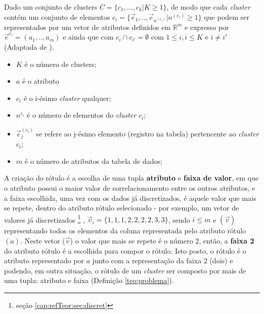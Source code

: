     \begin{teorema}
    Dado um conjunto de clusters ${C=\{c_1,...,c_k | K \geqslant 1\} }$, de modo que cada \textit{cluster} contém um conjunto de elementos ${c_i=\{\vec{e}_1,..,\vec{e}_{n^{(c_i)}}|n^{(c_i)} \geqslant 1 \}}$ que podem ser representados por um vetor de atributos definidos em ${\mathbb{R}^m }$ e expresso por ${ \vec{e}^{c_i}=(a_1,..,a_m)  }$ e ainda que  com ${ c_i \cap c_{i'}=\emptyset }$ com ${ 1 \leqslant i, i \leqslant K  }$ e ${ i \neq i' }$ (Adaptada de \cite{LOPES2014}).
        \begin{itemize}[noitemsep]
            \item ${K}$ é o número de clusters;
            \item ${a}$ é o atributo
            \item ${c_i}$ é o i-ésimo \textit{cluster} qualquer;
            \item ${n^{c_i}}$ é o número de elementos do \textit{cluster} ${c_i}$;
            \item ${\vec{e}^{(c_i)}_j}$ se refere ao j-ésimo  elemento (registro na tabela) pertencente ao \textit{cluster} ${c_i}$;
            \item ${m}$ é o número de atributos da tabela de dados;
        \end{itemize}
    \label{teo:problema}
    \end{teorema}

A criação do rótulo é a escolha de uma tupla \textbf{atributo} e \textbf{faixa de valor}, em que o atributo possui o maior valor de correlacionamento entre os outros atributos, e a faixa escolhida, uma vez com os dados já discretizados, é aquele valor que mais se repete, dentro do atributo rótulo selecionado - por exemplo, um vetor de valores já discretizados \footnote{ seção \ref{cap:refTeor:sec:discret}} , ${\vec{v}_i=\{1,1,1,2,2,2,2,3,3\}}$, sendo $i\leqslant m$ e ${(\vec{v})}$ representando todos os elementos da coluna representada pelo atributo rótulo  ${(a)}$. Neste vetor (${\vec{v}}$) o valor que mais se repete é o número 2, então, a \textbf{faixa 2} do atributo rótulo é a escolhida para compor o rótulo. Isto posto, o rótulo é o atributo representado por ${a}$ junto com a representação da faixa 2 (dois) e podendo, em outra situação, o rótulo de um \textit{cluster} ser composto por mais de uma tupla: atributo e faixa (Definição \ref{teo:problema}).



